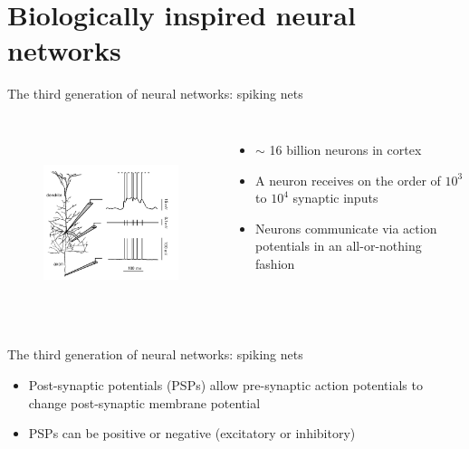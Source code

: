 \documentclass[aspectratio=169]{beamer}
\begin{document}
\section{Biologically inspired neural networks}
\begin{frame}{The third generation of neural networks: spiking nets}

\begin{columns}
\begin{figure}
\includegraphics[height=55mm, width=75mm]{figure-18}
\end{figure}
\begin{itemize}
\item $\sim$ 16 billion neurons in cortex
\item A neuron receives on the order of $10^{3}$ to $10^{4}$ synaptic inputs
\item Neurons communicate via action potentials in an all-or-nothing fashion
\end{itemize}

\end{columns} 

\end{frame}

\begin{frame}{The third generation of neural networks: spiking nets}

\begin{itemize}
\item Post-synaptic potentials (PSPs) allow pre-synaptic action potentials to change post-synaptic membrane potential
\item PSPs can be positive or negative (excitatory or inhibitory)
\end{itemize}


\end{frame}
\end{document}
